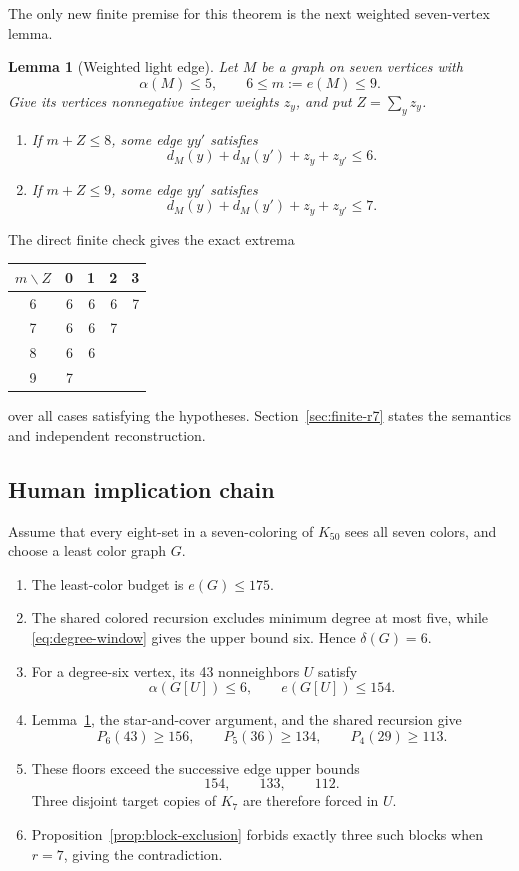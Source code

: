 \documentclass[11pt,reqno,a4paper]{amsart}
\newtheorem{lemma}[theorem]{Lemma}
\theoremstyle{definition}
\theoremstyle{remark}
\begin{document}
The only new finite premise for this theorem is the next weighted
seven-vertex lemma.

\begin{lemma}[Weighted light edge]\label{lem:r7-light-edge}
Let $M$ be a graph on seven vertices with
\[
  \alpha(M)\leq5,
  \qquad 6\leq m:=e(M)\leq9.
\]
Give its vertices nonnegative integer weights $z_y$, and put
$Z=\sum_yz_y$.
\begin{enumerate}[label=\textup{(\roman*)}]
\item If $m+Z\leq8$, some edge $yy'$ satisfies
  \[
    d_M(y)+d_M(y')+z_y+z_{y'}\leq6.
  \]
\item If $m+Z\leq9$, some edge $yy'$ satisfies
  \[
    d_M(y)+d_M(y')+z_y+z_{y'}\leq7.
  \]
\end{enumerate}
\end{lemma}

The direct finite check gives the exact extrema
\begin{center}
\begin{tabular}{c@{\qquad}rrrr}
\toprule
$m\backslash Z$&0&1&2&3\\
\midrule
6&6&6&6&7\\
7&6&6&7&\\
8&6&6&&\\
9&7&&&\\
\bottomrule
\end{tabular}
\end{center}
over all cases satisfying the hypotheses. Section~\ref{sec:finite-r7}
states the semantics and independent reconstruction.

\subsection{Human implication chain}

Assume that every eight-set in a seven-coloring of $K_{50}$ sees all seven
colors, and choose a least color graph $G$.
\begin{enumerate}[label=\textup{R7.\arabic*},leftmargin=3.5em]
\item The least-color budget is $e(G)\leq175$.
\item The shared colored recursion excludes minimum degree at most five,
  while \eqref{eq:degree-window} gives the upper bound six. Hence
  $\delta(G)=6$.
\item For a degree-six vertex, its 43 nonneighbors $U$ satisfy
  \[
    \alpha(G[U])\leq6,
    \qquad e(G[U])\leq154.
  \]
\item Lemma~\ref{lem:r7-light-edge}, the star-and-cover argument, and the
  shared recursion give
  \[
    P_6(43)\geq156,
    \qquad P_5(36)\geq134,
    \qquad P_4(29)\geq113.
  \]
\item These floors exceed the successive edge upper bounds
  \[
    154,\qquad133,\qquad112.
  \]
  Three disjoint target copies of $K_7$ are therefore forced in $U$.
\item Proposition~\ref{prop:block-exclusion} forbids exactly three such
  blocks when $r=7$, giving the contradiction.
\end{enumerate}
\end{document}
